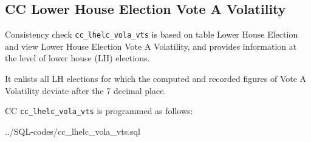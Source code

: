 \subsection{CC Lower House Election Vote A Volatility}\label{cc_lhelc_vola_vts}
Consistency check \texttt{\footnotesize cc\_lhelc\_vola\_vts} is based on table Lower House Election and view Lower House Election Vote A Volatility, and provides information at the level of lower house (LH) elections.

It enlists all LH elections for which the computed and recorded figures of Vote A Volatility deviate after the 7  decimal place.

CC \texttt{\footnotesize cc\_lhelc\_vola\_vts} is programmed as follows:

%
{../SQL-codes/cc_lhelc_vola_vts.sql}

